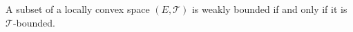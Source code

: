 A subset of a locally convex space $(E, \mathcal{T})$ is weakly bounded if and only if it is $\mathcal{T}$-bounded.

